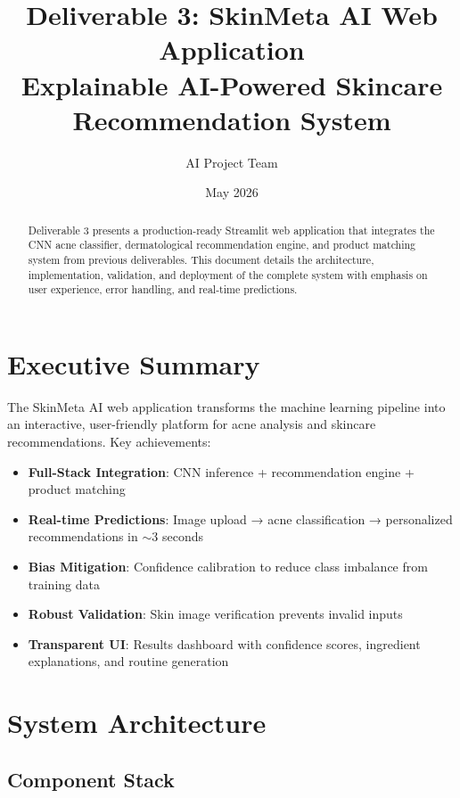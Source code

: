 \documentclass[12pt,a4paper]{article}
\title{\textbf{Deliverable 3: SkinMeta AI Web Application} \\ \Large Explainable AI-Powered Skincare Recommendation System}
\author{AI Project Team}
\date{May 2026}
\begin{document}
\maketitle

\begin{abstract}
Deliverable 3 presents a production-ready Streamlit web application that integrates the CNN acne classifier, dermatological recommendation engine, and product matching system from previous deliverables. This document details the architecture, implementation, validation, and deployment of the complete system with emphasis on user experience, error handling, and real-time predictions.
\end{abstract}

\tableofcontents
\newpage

\section{Executive Summary}

The SkinMeta AI web application transforms the machine learning pipeline into an interactive, user-friendly platform for acne analysis and skincare recommendations. Key achievements:

\begin{itemize}
    \item \textbf{Full-Stack Integration}: CNN inference + recommendation engine + product matching
    \item \textbf{Real-time Predictions}: Image upload → acne classification → personalized recommendations in $\sim$3 seconds
    \item \textbf{Bias Mitigation}: Confidence calibration to reduce class imbalance from training data
    \item \textbf{Robust Validation}: Skin image verification prevents invalid inputs
    \item \textbf{Transparent UI}: Results dashboard with confidence scores, ingredient explanations, and routine generation
\end{itemize}

\section{System Architecture}

\subsection{Component Stack}
\end{document}
